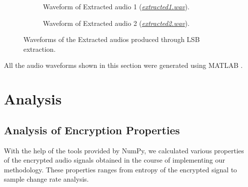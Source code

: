\documentclass[a4paper]{cas-sc}
\begin{document}
\begin{figure}[pos=h]
    \begin{subfigure}[h]{0.45\textwidth}
        \begin{center}
            
            \caption{Waveform of Extracted audio 1 (\href{https://drive.google.com/file/d/12_0keSBukOVs4bYei2KcD-kNjAPxFFdQ/view?usp=drive_link}{\textit{extracted1.wav}}).}
            \label{fig:extracted1}
        \end{center}
    \end{subfigure}
    \hfill
    \begin{subfigure}[h]{0.45\textwidth}
        \begin{center}
            
            \caption{Waveform of Extracted audio 2 (\href{https://drive.google.com/file/d/1Ikted9eaGw5HmMriXayIZHRsX-7acT6Z/view?usp=drive_link}{\textit{extracted2.wav}}).}
            \label{fig:extracted2}
        \end{center}
    \end{subfigure}
    \caption{Waveforms of the Extracted audios produced through LSB extraction.}
\end{figure}

All the audio waveforms shown in this section were generated using MATLAB \cite{MATLAB:R2016a}.
\section{Analysis}
\label{sec:analysis}
\subsection{Analysis of Encryption Properties}
With the help of the tools provided by NumPy, we calculated various properties of the encrypted audio signals obtained in the course of implementing our methodology. These properties ranges from entropy of the encrypted signal to sample change rate analysis.
\end{document}
